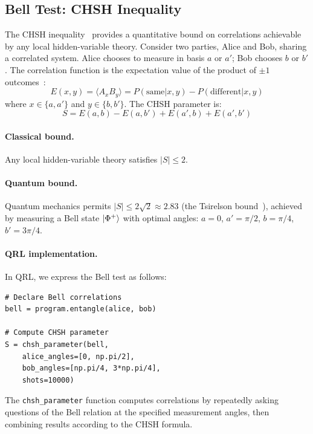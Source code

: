 \documentclass[submission,copyright,creativecommons]{eptcs}
\newcommand{\qrl}{\textsc{QRL}}
\begin{document}
\subsection{Bell Test: CHSH Inequality}

The CHSH inequality~\cite{chsh1969} provides a quantitative bound on correlations
achievable by any local hidden-variable theory. Consider two parties, Alice and
Bob, sharing a correlated system. Alice chooses to measure in basis $a$ or $a'$;
Bob chooses $b$ or $b'$. The correlation function is the expectation value
of the product of $\pm 1$ outcomes~\cite{nielsen2010}:
\begin{equation}
E(x, y) = \langle A_x B_y \rangle = P(\text{same}|x,y) - P(\text{different}|x,y)
\end{equation}
where $x \in \{a, a'\}$ and $y \in \{b, b'\}$. The CHSH parameter is:
\begin{equation}
S = E(a,b) - E(a,b') + E(a',b) + E(a',b')
\end{equation}

\paragraph{Classical bound.}
Any local hidden-variable theory satisfies $|S| \leq 2$.

\paragraph{Quantum bound.}
Quantum mechanics permits $|S| \leq 2\sqrt{2} \approx 2.83$ (the Tsirelson
bound~\cite{tsirelson1980}), achieved by measuring a Bell state $\ket{\Phi^+}$
with optimal angles: $a = 0$, $a' = \pi/2$, $b = \pi/4$, $b' = 3\pi/4$.

\paragraph{QRL implementation.}
In \qrl{}, we express the Bell test as follows:

\begin{lstlisting}
# Declare Bell correlations
bell = program.entangle(alice, bob)

# Compute CHSH parameter
S = chsh_parameter(bell,
    alice_angles=[0, np.pi/2],
    bob_angles=[np.pi/4, 3*np.pi/4],
    shots=10000)
\end{lstlisting}

The \texttt{chsh\_parameter} function computes correlations by repeatedly
asking questions of the Bell relation at the specified measurement angles,
then combining results according to the CHSH formula.
\end{document}

